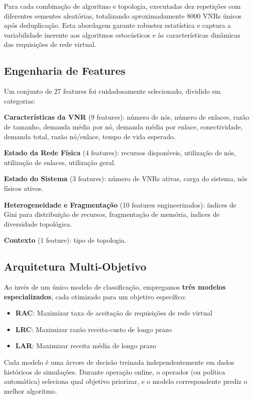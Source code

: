 \documentclass[conference]{IEEEtran}
\begin{document}
Para cada combinação de algoritmo e topologia, executadas dez repetições com diferentes sementes aleatórias, totalizando aproximadamente 8000 VNRs únicos após deduplicação. Esta abordagem garante robustez estatística e captura a variabilidade inerente aos algoritmos estocásticos e às características dinâmicas das requisições de rede virtual.

\subsection{Engenharia de Features}

Um conjunto de 27 features foi cuidadosamente selecionado, dividido em categorias:

\textbf{Características da VNR} (9 features): número de nós, número de enlaces, razão de tamanho, demanda média por nó, demanda média por enlace, conectividade, demanda total, razão nó/enlace, tempo de vida esperado.

\textbf{Estado da Rede Física} (4 features): recursos disponíveis, utilização de nós, utilização de enlaces, utilização geral.

\textbf{Estado do Sistema} (3 features): número de VNRs ativas, carga do sistema, nós físicos ativos.

\textbf{Heterogeneidade e Fragmentação} (10 features engineerizados): índices de Gini para distribuição de recursos, fragmentação de memória, índices de diversidade topológica.

\textbf{Contexto} (1 feature): tipo de topologia.

\subsection{Arquitetura Multi-Objetivo}

Ao invés de um único modelo de classificação, empregamos \textbf{três modelos especializados}, cada otimizado para um objetivo específico:

\begin{itemize}
    \item \textbf{RAC}: Maximizar taxa de aceitação de requisições de rede virtual
    \item \textbf{LRC}: Maximizar razão receita-custo de longo prazo
    \item \textbf{LAR}: Maximizar receita média de longo prazo
\end{itemize}

Cada modelo é uma árvore de decisão treinada independentemente em dados históricos de simulações. Durante operação online, o operador (ou política automática) seleciona qual objetivo priorizar, e o modelo correspondente prediz o melhor algoritmo.
\end{document}
